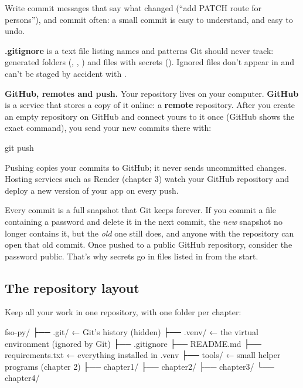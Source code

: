 Write commit messages that say what changed (``add PATCH route for persons''), and commit often: a small commit is easy to understand, and easy to undo.

\textbf{.gitignore} is a text file listing names and patterns Git should never track: generated folders (, , ) and files with secrets (). Ignored files don't appear in  and can't be staged by accident with .

\textbf{GitHub, remotes and push.} Your repository lives on your computer. \textbf{GitHub} is a service that stores a copy of it online: a \textbf{remote} repository. After you create an empty repository on GitHub and connect yours to it once (GitHub shows the exact  command), you send your new commits there with:

\begin{code}
git push
\end{code}

Pushing copies your commits to GitHub; it never sends uncommitted changes. Hosting services such as Render (chapter 3) watch your GitHub repository and deploy a new version of your app on every push.

\begin{warn}
Every commit is a full snapshot that Git keeps forever. If you commit a file containing a password and delete it in the next commit, the \emph{new} snapshot no longer contains it, but the \emph{old} one still does, and anyone with the repository can open that old commit. Once pushed to a public GitHub repository, consider the password public. That's why secrets go in files listed in  from the start.
\end{warn}

\subsection{The repository layout}

Keep all your work in one repository, with one folder per chapter:

\begin{code}
fso-py/
├── .git/               ← Git's history (hidden)
├── .venv/              ← the virtual environment (ignored by Git)
├── .gitignore
├── README.md
├── requirements.txt    ← everything installed in .venv
├── tools/              ← small helper programs (chapter 2)
├── chapter1/
├── chapter2/
├── chapter3/
└── chapter4/
\end{code}

